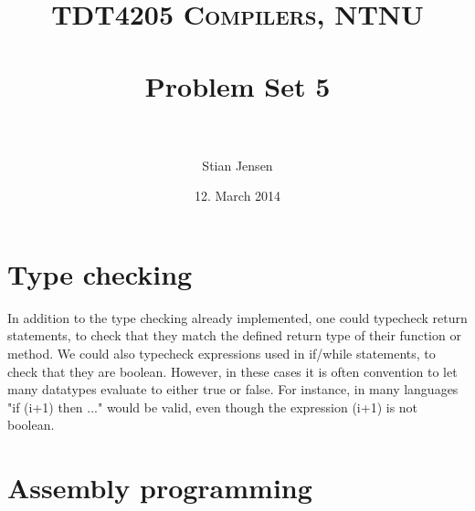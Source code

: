 \documentclass[paper=a4, fontsize=11pt]{scrartcl} %
\title{
\normalfont \normalsize
\textsc{TDT4205 Compilers, NTNU} \\ [25pt] %
\horrule{0.5pt} \\[0.4cm] %
\huge Problem Set 5 \\ %
\horrule{2pt} \\[0.5cm] %
}
\author{Stian Jensen} %
\date{\normalsize 12. March 2014} %
\numberwithin{equation}{section} %
\numberwithin{figure}{section} %
\numberwithin{table}{section} %
\begin{document}
\maketitle %


\section{Type checking}

In addition to the type checking already implemented, one could typecheck return statements, to check that they match the defined return type of their function or method.
We could also typecheck expressions used in if/while statements, to check that they are boolean.
However, in these cases it is often convention to let many datatypes evaluate to either true or false. For instance, in many languages "if (i+1) then ..." would be valid, even though the expression (i+1) is not boolean.

\newpage

\section{Assembly programming}
\end{document}
